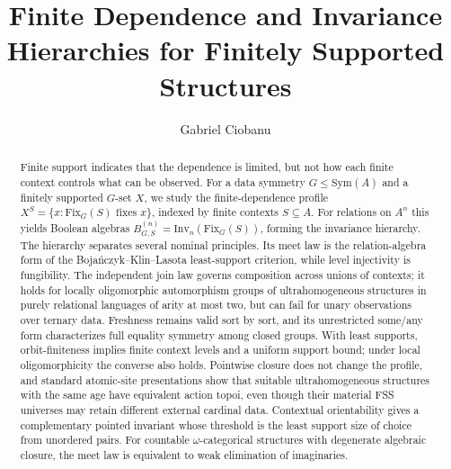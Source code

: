 \documentclass{lmcs}
\newcommand{\Sym}{\mathrm{Sym}}
\newcommand{\Fix}{\mathrm{Fix}}
\newcommand{\Inv}{\mathrm{Inv}}
\begin{document}
\title[Finite Dependence and Invariance Hierarchies]
{Finite Dependence and Invariance Hierarchies for Finitely Supported Structures}

\author[Gabriel Ciobanu]{Gabriel Ciobanu}
\address{Romanian Academy and A.I.Cuza University, Ia\c{s}i, Romania}

\begin{abstract}
Finite support indicates that the dependence is limited, but not how each finite context controls what can be observed. For a data symmetry $G\leq\Sym(A)$ and a finitely supported $G$-set $X$, we study the finite-dependence profile
$X^S=\{x:\Fix_G(S)\text{ fixes }x\}$, indexed by finite contexts
$S\subseteq A$. For relations on $A^n$ this yields Boolean algebras
$B^{(n)}_{G,S}=\Inv_n(\Fix_G(S))$, forming the invariance hierarchy.
%
The hierarchy separates several nominal principles. Its meet law is the
relation-algebra form of the Boja\'nczyk--Klin--Lasota least-support
criterion, while level injectivity is fungibility. The independent join
law governs composition across unions of contexts; it holds for locally
oligomorphic automorphism groups of ultrahomogeneous structures in purely
relational languages of arity at most two, but can fail for unary
observations over ternary data. Freshness remains valid sort by sort, and
its unrestricted some/any form characterizes full equality symmetry among
closed groups. With least supports, orbit-finiteness implies finite context
levels and a uniform support bound; under local oligomorphicity the converse
also holds.
%
Pointwise closure does not change the profile, and standard atomic-site
presentations show that suitable ultrahomogeneous structures with the same
age have equivalent action topoi, even though their material FSS universes
may retain different external cardinal data. Contextual orientability gives
a complementary pointed invariant whose threshold is the least support size
of choice from unordered pairs. For countable $\omega$-categorical
structures with degenerate algebraic closure, the meet law is equivalent to
weak elimination of imaginaries.
\end{abstract}
\end{document}
